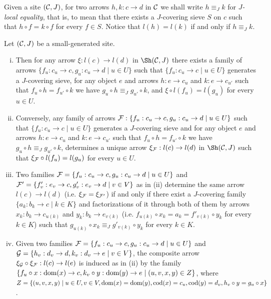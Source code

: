 \documentclass[a4paper,12pt]{article}
\begin{document}
Given a site $({\cal C}, J)$, for two arrows $h,k:c\to d$ in $\cal C$ we shall write $h\equiv_{J} k$ for \emph{$J$-local equality}, that is, to mean that there exists a $J$-covering sieve $S$ on $c$ such that $h\circ f=k\circ f$ for every $f\in S$. Notice that $l(h)=l(k)$ if and only if $h\equiv_{J} k$.  


\begin{proposition}\label{propexplicit}
	Let $({\cal C}, J)$ be a small-generated site. 
	
	\begin{enumerate}[(i)]
		\item Then for any arrow $\xi:l(c)\to l(d)$ in $\Sh({\cal C}, J)$ there exists a family of arrows $\{f_{u}:c_{u}\to c, g_{u}:c_{u}\to d \mid u\in U\}$ such that $\{f_{u}:c_{u}\to c \mid u\in U\}$ generates a $J$-covering sieve, for any object $e$ and arrows $h:e\to c_{u}$ and $k:e\to c_{u'}$ such that $f_{u}\circ h=f_{u'}\circ k$ we have $g_{u}\circ h\equiv_{J} g_{u'}\circ k$, and $\xi \circ l(f_{u})=l(g_{u})$ for every $u\in U$.  
		
		\item Conversely, any family of arrows ${\cal F}:\{f_{u}:c_{u}\to c, g_{u}:c_{u}\to d \mid u\in U\}$ such that $\{f_{u}:c_{u}\to c \mid u\in U\}$ generates a $J$-covering sieve and for any object $e$ and arrows $h:e\to c_{u}$ and $k:e\to c_{u'}$ such that $f_{u}\circ h=f_{u'}\circ k$ we have $g_{u}\circ h\equiv_{J} g_{u'}\circ k$, determines a unique arrow $\xi_{\cal F}:l(c)\to l(d)$ in $\Sh({\cal C}, J)$ such that $\xi_{\cal F}\circ l(f_{u})=l(g_{u})$ for every $u\in U$. 
		
		\item Two families ${\cal F}=\{f_{u}:c_{u}\to c, g_{u}:c_{u}\to d \mid u\in U\}$ and ${\cal F}'=\{f'_{v}:e_{v}\to c, g'_{v}:e_{v}\to d \mid v\in V\}$ as in (ii) determine the same arrow $l(c)\to l(d)$ (i.e. $\xi_{\cal F}=\xi_{{\cal F}'}$) if and only if there exist a $J$-covering family $\{a_{k}:b_{k}\to c \mid k\in K\}$ and factorizations of it through both of them by arrows $x_{k}:b_{k}\to c_{u(k)}$ and $y_{k}:b_{k}\to e_{v(k)}$ (i.e. $f_{u(k)}\circ x_{k}=a_{k}=f'_{v(k)}\circ y_{k}$ for every $k\in K$) such that $g_{u(k)}\circ x_{k}\equiv_{J} g'_{v(k)}\circ y_{k}$ for every $k\in K$.
		
		\item Given two families ${\cal F}=\{f_{u}:c_{u}\to c, g_{u}:c_{u}\to d \mid u\in U\}$ and ${\cal G}=\{h_{v}:d_{v}\to d, k_{v}:d_{v}\to e \mid v\in V\}$, the composite arrow $\xi_{\cal G}\circ \xi_{\cal F}:l(c)\to l(e)$ is induced as in (ii) by the family $\{f_{u}\circ x:\textup{dom}(x)\to c, k_{v}\circ y:\textup{dom}(y)\to e \mid (u,v,x,y )\in Z\}$, where $Z=\{(u, v, x, y) \mid  u\in U, v\in V, \textup{dom}(x)=\textup{dom}(y), \textup{cod}(x)=c_{u}, \textup{cod}(y)=d_{v}, h_{v}\circ y=g_{u}\circ x\}$. 
	\end{enumerate} 
\end{proposition}
\end{document}
